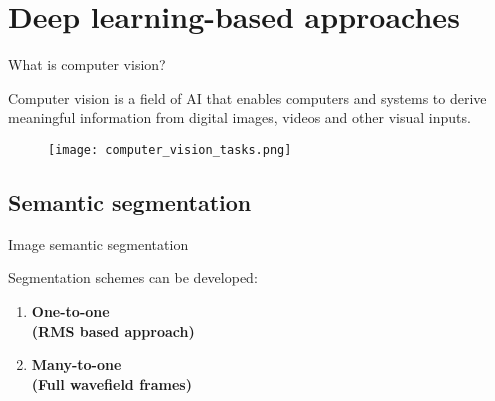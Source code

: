 \documentclass[10pt,aspectratio=169]{beamer} %
\begin{document}
\section{Deep learning-based approaches}
\setcounter{subfigure}{0}
\begin{frame}{What is computer vision?}
	\begin{minipage}[c]{0.30\textwidth}
		Computer vision is a field of AI that enables computers and systems to derive meaningful information from digital images, videos and other visual inputs. 
	\end{minipage}
	\hfill
	\begin{minipage}[c]{0.65\textwidth}
		\begin{figure}
			\centering
			\texttt{[image: computer\_vision\_tasks.png]}
		\end{figure}
	\end{minipage}
\end{frame}
\subsection{Semantic segmentation}
\setcounter{subfigure}{0}
\begin{frame}{Image semantic segmentation}
	\begin{minipage}[l]{0.35\textwidth}
		Segmentation schemes can be developed:
		\medskip
		\begin{enumerate}
			\item \textbf{One-to-one \\(RMS based approach)} 
			\medskip
			\item \textbf{Many-to-one \\(Full wavefield frames)}
		\end{enumerate}
	\end{minipage}
	\begin{minipage}[l]{0.6\textwidth}
		\begin{figure}
			\centering
			\qquad
			\qquad
			\\
			\qquad
			
		\end{figure}
	\end{minipage}
\end{frame}
\end{document}
